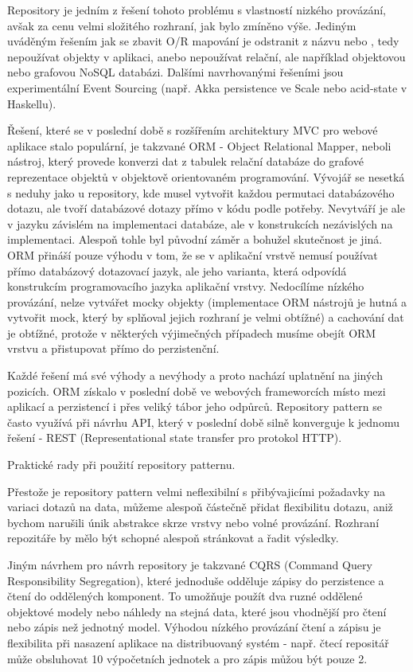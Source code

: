 \documentclass[10pt]{article}
\begin{document}
Repository je jedním z řešení tohoto problému s vlastností nizkého provázání,
avšak za cenu velmi složitého rozhraní, jak bylo zmíněno výše. Jediným uváděným
řešením jak se zbavit O/R mapování je odstranit z názvu  nebo ,
tedy nepoužívat objekty v aplikaci, anebo nepoužívat relační, ale například
objektovou nebo grafovou NoSQL databázi. Dalšími navrhovanými řešeními jsou
experimentální Event Sourcing (např. Akka persistence ve Scale nebo acid-state
v Haskellu).

Řešení, které se v poslední době s rozšířením architektury MVC pro webové
aplikace stalo populární, je takzvané ORM - Object Relational Mapper, neboli
nástroj, který provede konverzi dat z tabulek relační databáze do grafové
reprezentace objektů v objektově orientovaném programování. Vývojář se nesetká
s neduhy jako u repository, kde musel vytvořit každou permutaci databázového
dotazu, ale tvoří databázové dotazy přímo v kódu podle potřeby. Nevytváří je
ale v jazyku závislém na implementaci databáze, ale v konstrukcích nezávislých
na implementaci. Alespoň tohle byl původní záměr a bohužel skutečnost je jiná.
ORM přináší pouze výhodu v tom, že se v aplikační vrstvě nemusí používat přímo
databázový dotazovací jazyk, ale jeho varianta, která odpovídá konstrukcím
programovacího jazyka aplikační vrstvy. Nedocílíme nízkého provázání, nelze
vytvářet mocky objekty (implementace ORM nástrojů je hutná a vytvořit mock,
který by splňoval jejich rozhraní je velmi obtížné) a cachování dat je obtížné,
protože v některých výjimečných případech musíme obejít ORM vrstvu a
přistupovat přímo do perzistenční.

Každé řešení má své výhody a nevýhody a proto nachází uplatnění na jiných
pozicích.  ORM získalo v poslední době ve webových frameworcích místo mezi
aplikací a perzistencí i přes veliký tábor jeho odpůrců. Repository pattern se
často využívá při návrhu API, který v poslední době silně konverguje k jednomu
řešení - REST (Representational state transfer pro protokol HTTP).

Praktické rady při použití repository patternu. 

Přestože je repository pattern velmi neflexibilní s přibývajicími požadavky na
variaci dotazů na data, můžeme alespoň částečně přidat flexibilitu dotazu, aniž
bychom narušili únik abstrakce skrze vrstvy nebo volné provázání. Rozhraní
repozitáře by mělo být schopné alespoň stránkovat a řadit výsledky.

Jiným návrhem pro návrh repository je takzvané CQRS (Command Query
Responsibility Segregation), které jednoduše odděluje zápisy do perzistence a
čtení do oddělených komponent. To umožňuje použít dva ruzné oddělené objektové
modely nebo náhledy na stejná data, které jsou vhodnější pro čtení nebo zápis
než jednotný model. Výhodou nízkého provázání čtení a zápisu je flexibilita při
nasazení aplikace na distribuovaný systém - např. čtecí repositář může
obsluhovat 10 výpočetních jednotek a pro zápis můžou být pouze 2.
\end{document}
